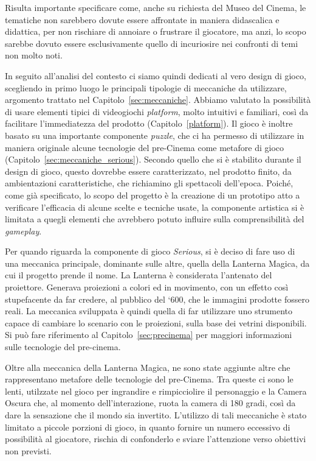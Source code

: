 Risulta importante specificare come, anche su richiesta del Museo del Cinema, le tematiche non sarebbero dovute essere affrontate in maniera didascalica e didattica, per non rischiare di annoiare o frustrare il giocatore, ma anzi, lo scopo sarebbe dovuto essere esclusivamente quello di incuriosire nei confronti di temi non molto noti.

In seguito all’analisi del contesto ci siamo quindi dedicati al vero design di gioco, scegliendo in primo luogo le principali tipologie di meccaniche da utilizzare, argomento trattato nel Capitolo~\ref{sec:meccaniche}. Abbiamo valutato la possibilità di usare elementi tipici di videogiochi \textit{platform}, molto intuitivi e familiari, così da facilitare l’immediatezza del prodotto (Capitolo~\ref{platform}). Il gioco è inoltre basato su una importante componente \textit{puzzle}, che ci ha permesso di utilizzare in maniera originale alcune tecnologie del pre-Cinema come metafore di gioco (Capitolo~\ref{sec:meccaniche_serious}).
Secondo quello che si è stabilito durante il design di gioco, questo dovrebbe essere caratterizzato, nel prodotto finito, da ambientazioni caratteristiche, che richiamino gli spettacoli dell’epoca. Poiché, come già specificato, lo scopo del progetto è la creazione di un prototipo atto a verificare l’efficacia di alcune scelte e tecniche usate, la componente artistica si è limitata a quegli elementi che avrebbero potuto influire sulla comprensibilità del \textit{gameplay}.

Per quando riguarda la componente di gioco \textit{Serious}, si è deciso di fare uso di una meccanica principale, dominante sulle altre, quella della Lanterna Magica, da cui il progetto prende il nome. La Lanterna è considerata l’antenato del proiettore. Generava proiezioni a colori ed in movimento, con un effetto così stupefacente da far credere, al pubblico del ‘600, che le immagini prodotte fossero reali. La meccanica sviluppata è quindi quella di far utilizzare uno strumento capace di cambiare lo scenario con le proiezioni, sulla base dei vetrini disponibili. Si può fare riferimento al Capitolo~\ref{sec:precinema} per maggiori informazioni sulle tecnologie del pre-cinema.

Oltre alla meccanica della Lanterna Magica, ne sono state aggiunte altre che rappresentano metafore delle tecnologie del pre-Cinema. Tra queste ci sono le lenti, utilzzate nel gioco per ingrandire e rimpicciolire il personaggio e la Camera Oscura che, al momento dell’interazione, ruota la camera di 180 gradi, così da dare la sensazione che il mondo sia invertito. L’utilizzo di tali meccaniche è stato limitato a piccole porzioni di gioco, in quanto fornire un numero eccessivo di possibilità al giocatore, rischia di confonderlo e sviare l’attenzione verso obiettivi non previsti.

